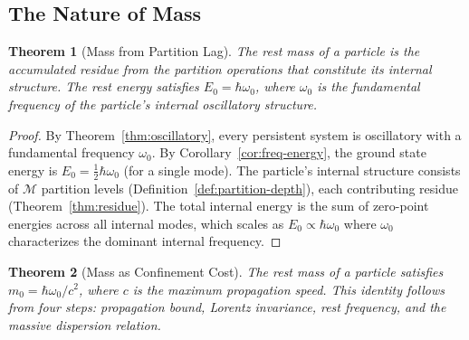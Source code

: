 \documentclass[11pt,twocolumn,a4paper]{article}
\newtheorem{theorem}{Theorem}[section]
\theoremstyle{definition}
\theoremstyle{remark}
\newcommand{\Depth}{\mathcal{M}}
\begin{document}
\subsection{The Nature of Mass}
\label{sec:mass-nature}

\begin{theorem}[Mass from Partition Lag]
\label{thm:mass-lag}
The rest mass of a particle is the accumulated residue from the partition operations that constitute its internal structure. The rest energy satisfies $E_0 = \hbar\omega_0$, where $\omega_0$ is the fundamental frequency of the particle's internal oscillatory structure.
\end{theorem}

\begin{proof}
By Theorem~\ref{thm:oscillatory}, every persistent system is oscillatory with a fundamental frequency $\omega_0$. By Corollary~\ref{cor:freq-energy}, the ground state energy is $E_0 = \tfrac{1}{2}\hbar\omega_0$ (for a single mode). The particle's internal structure consists of $\Depth$ partition levels (Definition~\ref{def:partition-depth}), each contributing residue (Theorem~\ref{thm:residue}). The total internal energy is the sum of zero-point energies across all internal modes, which scales as $E_0 \propto \hbar\omega_0$ where $\omega_0$ characterizes the dominant internal frequency.
\end{proof}

\begin{theorem}[Mass as Confinement Cost]
\label{thm:mass-confinement}
The rest mass of a particle satisfies $m_0 = \hbar\omega_0/c^2$, where $c$ is the maximum propagation speed. This identity follows from four steps: propagation bound, Lorentz invariance, rest frequency, and the massive dispersion relation.
\end{theorem}
\end{document}
